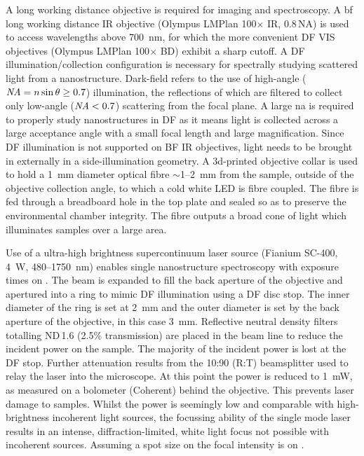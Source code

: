 \documentclass{article}
\begin{document}
A long working distance objective is required for imaging and spectroscopy. A \gls{bf} long working distance IR objective (Olympus LMPlan 100$\times$ IR, 0.8\,NA) is used to access wavelengths above \SI{700}{nm}, for which the more convenient DF VIS objectives (Olympus LMPlan 100$\times$ BD) exhibit a sharp cutoff. A DF illumination/collection configuration is necessary for spectrally studying scattered light from a nanostructure. Dark-field refers to the use of high-angle ($\mathit{NA}=n\sin\theta\geq0.7$) illumination, the reflections of which are filtered to collect only low-angle ($\mathit{NA}<0.7$) scattering from the focal plane. A large \gls{na} is required to properly study nanostructures in DF as it means light is collected across a large acceptance angle with a small focal length and large magnification. Since DF illumination is not supported on BF IR objectives, light needs to be brought in externally in a side-illumination geometry. A 3d-printed objective collar is used to hold a \SI{1}{mm} diameter optical fibre $\sim$1--\SI{2}{mm} from the sample, outside of the objective collection angle, to which a cold white LED is fibre coupled. The fibre is fed through a breadboard hole in the top plate and sealed so as to preserve the environmental chamber integrity. The fibre outputs a broad cone of light which illuminates samples over a large area.

Use of a ultra-high brightness supercontinuum laser source (Fianium SC-400, \SI{4}{W}, 480--\SI{1750}{nm}) enables single nanostructure spectroscopy with exposure times on . The beam is expanded to fill the back aperture of the objective and apertured into a ring to mimic DF illumination using a DF disc stop. The inner diameter of the ring is set at \SI{2}{mm} and the outer diameter is set by the back aperture of the objective, in this case \SI{3}{mm}. %
Reflective neutral density filters totalling ND\,1.6 (2.5\% transmission) are placed in the beam line to reduce the incident power on the sample. The majority of the incident power is lost at the DF stop. Further attenuation results from the 10:90 (R:T) beamsplitter used to relay the laser into the microscope. At this point the power is reduced to \SI{1}{mW}, as measured on a bolometer (Coherent) behind the objective. This prevents laser damage to samples. Whilst the power is seemingly low and comparable with high-brightness incoherent light sources, the focussing ability of the single mode laser results in an intense, diffraction-limited, white light focus not possible with incoherent sources. Assuming a spot size on  the focal intensity is on .
\end{document}
